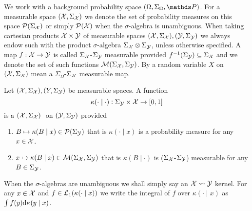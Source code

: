 \documentclass{article}
\begin{document}
We work with a background probability space $(\Omega, \Sigma_\Omega, \Prob)$.
For a measurable space $(\mathcal{X}, \Sigma_{\mathcal{X}})$ we denote
the set of probability measures on this space $\mathcal{P}(\Sigma_\mathcal{X})$ or
simply $\mathcal{P}(\mathcal{X})$ when the $\sigma$-algebra is unambiguous.
When taking cartesian products $\mathcal{X} \times \mathcal{Y}$ of measurable spaces
$(\mathcal{X}, \Sigma_\mathcal{X}), (\mathcal{Y}, \Sigma_\mathcal{Y})$ we always endow such
with the product $\sigma$-algebra $\Sigma_\mathcal{X} \otimes \Sigma_\mathcal{Y}$,
unless otherwise specified.
A map $f: \mathcal{X} \to \mathcal{Y}$ is called $\Sigma_{\mathcal{X}}$-$\Sigma_{\mathcal{Y}}$
measurable provided $f^{-1}(\Sigma_{\mathcal{Y}}) \subseteq \Sigma_{\mathcal{X}}$
and we denote the set of such functions $\mathcal{M}(\Sigma_{\mathcal{X}},
\Sigma_{\mathcal{Y}})$.
By a random variable $X$ on $(\mathcal{X}, \Sigma_{\mathcal{X}})$ mean a
$\Sigma_\Omega$-$\Sigma_{\mathcal{X}}$ measurable map.


\begin{defn}
  Let $(\mathcal{X}, \Sigma_\mathcal{X}), (Y, \Sigma_\mathcal{Y})$ be measurable spaces.
  A function
  \[ \kappa(\cdot \mid \cdot) : \Sigma_\mathcal{Y} \times \mathcal{X} \to [0,1] \]
  is a $(\mathcal{X}, \Sigma_\mathcal{X})$-
  on $(\mathcal{Y}, \Sigma_\mathcal{Y})$ provided
  \begin{enumerate}
    \item $B \mapsto \kappa(B \mid x) \in \mathcal{P}(\Sigma_\mathcal{Y})$
      that is $\kappa(\cdot \mid x)$ is a probability measure
      for any $x \in \mathcal{X}$.
    \item
      $x \mapsto \kappa(B \mid x) \in \mathcal{M}(\Sigma_\mathcal{X}, \Sigma_\mathcal{Y})$
      that is $\kappa(B \mid \cdot)$ is ($\Sigma_\mathcal{X}$-$\Sigma_\mathcal{Y}$)
      measurable for any $B \in \Sigma_\mathcal{Y}$.
  \end{enumerate}
  When the $\sigma$-algebras are unambiguous we shall simply say an
  $\mathcal{X} \leadsto \mathcal{Y}$ kernel.
  For any $x \in \mathcal{X}$ and $f \in \mathcal{L}_1(\kappa(\cdot \mid x))$
  we write the integral of $f$ over $\kappa(\cdot \mid x)$ as
  $\int f(y) \mathrm{d} \kappa(y \mid x)$.
  \label{defn:probKer}
\end{defn}
\end{document}
